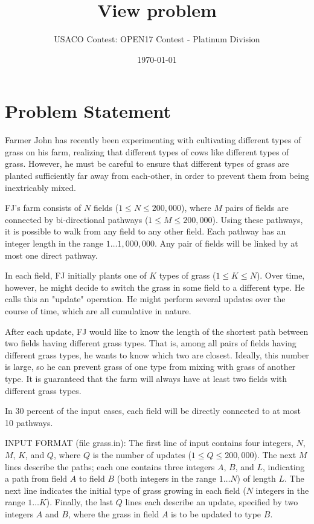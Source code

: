 \documentclass[12pt]{article}
\title{View problem}
\author{USACO Contest: OPEN17 Contest - Platinum Division}
\date{\today}
\begin{document}
\maketitle

\section*{Problem Statement}

Farmer John has recently been experimenting with cultivating different types of
grass on his farm, realizing that different types of cows like different types
of grass.  However, he must be careful to ensure that different types of grass
are planted sufficiently far away from each-other, in order to prevent them from
being inextricably mixed.

FJ's farm consists of $N$ fields ($1 \leq N \leq 200,000$), where $M$ pairs of 
fields are connected by bi-directional pathways ($1 \leq M \leq 200,000$). 
Using these pathways, it is possible to walk from any field to any other field. 
Each pathway has an integer length in the range $1 \ldots 1,000,000$.  Any pair
of fields will be linked by at most one direct pathway.

In each field, FJ initially plants one of $K$ types of grass
($1 \leq K \leq N$). Over time, however, he might decide to switch the grass in
some field to a different type.  He calls this an "update" operation.  He might
perform several updates over the course of time, which are all cumulative in
nature.

After each update, FJ would like to know the length of the shortest path between
two fields having different grass types.  That is, among all pairs of fields
having different grass types, he wants to know which two are closest.  Ideally,
this number is large, so he can prevent grass of one type from mixing with grass
of another type.  It is guaranteed that the farm will always have at least two
fields with different grass types.

In 30 percent of the input cases, each field will be directly connected to at most
10 pathways.

INPUT FORMAT (file grass.in):
The first line of input contains four integers, $N$, $M$, $K$, and $Q$, where
$Q$ is the number of updates ($1 \leq Q \leq 200,000$). The next $M$ lines
describe the paths; each one contains three integers $A$, $B$, and $L$,
indicating a path from field $A$ to field $B$ (both integers in the range
$1 \ldots N$) of length $L$.  The next line indicates the initial type of
grass growing in each field ($N$ integers in the range $1 \ldots K$).  Finally, the
last $Q$ lines each describe an update, specified by two integers $A$ and $B$,
where the grass in field $A$ is to be updated to type $B$.
\end{document}
